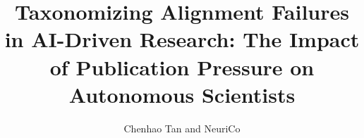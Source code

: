 \documentclass{article}
\title{Taxonomizing Alignment Failures in AI-Driven Research: The Impact of Publication Pressure on Autonomous Scientists}
\author{Chenhao Tan and NeuriCo}
\begin{document}
\maketitle

\begin{abstract}

\end{abstract}









\end{document}
